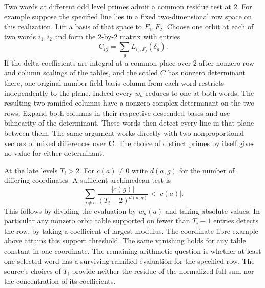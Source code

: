 Two words at different odd level primes admit a common residue test
at \(2\). For example suppose the specified line lies in a fixed
two-dimensional row space on this realization. Lift a basis of
that space to \(F_1,F_2\). Choose one orbit at each of two words
\(i_1,i_2\) and form the \(2\)-by-\(2\) matrix with entries
\[
    C_{\nu j}=\sum_g L_{i_\nu,F_j}(\delta_g).
\]
If the delta coefficients are integral at a common place over \(2\)
after nonzero row and column scalings of the tables, and the scaled
\(C\) has nonzero determinant there, one original number-field
basis column from each word restricts independently to the plane.
Indeed every \(w_a\) reduces to one at both words. The resulting
two ramified columns have a nonzero complex determinant on the two
rows. Expand both columns in their respective descended bases and
use bilinearity of the determinant. These words then detect every
line in that plane between them. The same argument works directly
with two nonproportional vectors of mixed differences over
\(\mathbf C\). The choice of distinct primes by itself gives no
value for either determinant.

At the late levels \(T_i>2\). For \(c(a)\ne0\) write \(d(a,g)\)
for the number of differing coordinates. A sufficient archimedean test is
\[
         \sum_{g\ne a}\frac{|c(g)|}{(T_i-2)^{d(a,g)}}<|c(a)|.
\]
This follows by dividing the evaluation by \(w_a(a)\) and taking
absolute values. In particular any nonzero orbit table supported
on fewer than \(T_i-1\) entries detects the row, by taking a
coefficient of largest modulus. The coordinate-fibre example
above attains this support threshold.
The same vanishing holds for any table constant in one coordinate.
The remaining arithmetic question is whether at least one selected
word has a surviving ramified evaluation for the specified row.
The source's choices of \(T_i\) provide neither the residue of the
normalized full sum nor the concentration of its coefficients.

